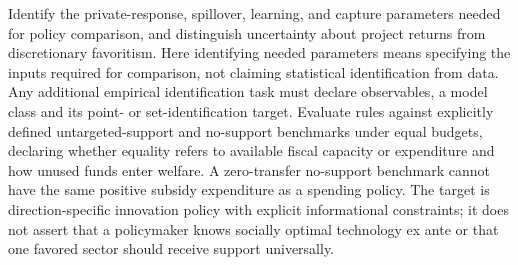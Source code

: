\documentclass[11pt,a4paper]{article}
\begin{document}
Identify the private-response, spillover, learning, and capture parameters needed for policy comparison, and distinguish uncertainty about project returns from discretionary favoritism. Here identifying needed parameters means specifying the inputs required for comparison, not claiming statistical identification from data. Any additional empirical identification task must declare observables, a model class and its point- or set-identification target. Evaluate rules against explicitly defined untargeted-support and no-support benchmarks under equal budgets, declaring whether equality refers to available fiscal capacity or expenditure and how unused funds enter welfare. A zero-transfer no-support benchmark cannot have the same positive subsidy expenditure as a spending policy. The target is direction-specific innovation policy with explicit informational constraints; it does not assert that a policymaker knows socially optimal technology ex ante or that one favored sector should receive support universally.
\end{document}
